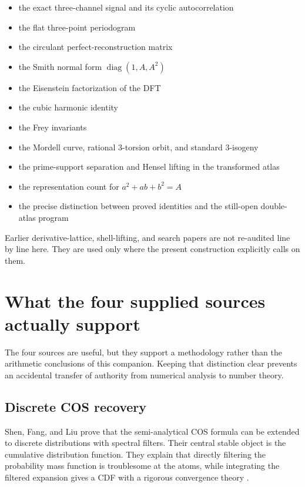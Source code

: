 \documentclass[11pt]{article}
\begin{document}
\begin{itemize}
  \item the exact three-channel signal and its cyclic autocorrelation
  \item the flat three-point periodogram
  \item the circulant perfect-reconstruction matrix
  \item the Smith normal form $\operatorname{diag}(1,A,A^2)$
  \item the Eisenstein factorization of the DFT
  \item the cubic harmonic identity
  \item the Frey invariants
  \item the Mordell curve, rational $3$-torsion orbit, and standard $3$-isogeny
  \item the prime-support separation and Hensel lifting in the transformed atlas
  \item the representation count for $a^2+ab+b^2=A$
  \item the precise distinction between proved identities and the still-open double-atlas program
\end{itemize}

Earlier derivative-lattice, shell-lifting, and search papers are not re-audited line by line here.  They are used only where the present construction explicitly calls on them.

\section{What the four supplied sources actually support}

The four sources are useful, but they support a methodology rather than the arithmetic conclusions of this companion.  Keeping that distinction clear prevents an accidental transfer of authority from numerical analysis to number theory.

\subsection{Discrete COS recovery}

Shen, Fang, and Liu prove that the semi-analytical COS formula can be extended to discrete distributions with spectral filters.  Their central stable object is the cumulative distribution function.  They explain that directly filtering the probability mass function is troublesome at the atoms, while integrating the filtered expansion gives a CDF with a rigorous convergence theory \cite{ShenFangLiu2024}.
\end{document}
